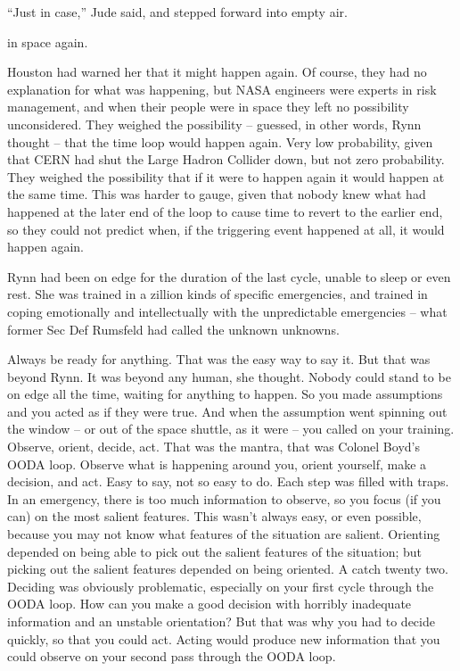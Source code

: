 “Just in case,” Jude said, and stepped forward into empty air.




 in space again.

Houston had warned her that it might happen again. Of course, they had no explanation for what was happening, but NASA engineers were experts in risk management, and when their people were in space they left no possibility unconsidered. They weighed the possibility – guessed, in other words, Rynn thought – that the time loop would happen again. Very low probability, given that CERN had shut the Large Hadron Collider down, but not zero probability. They weighed the possibility that if it were to happen again it would happen at the same time. This was harder to gauge, given that nobody knew what had happened at the later end of the loop to cause time to revert to the earlier end, so they could not predict when, if the triggering event happened at all, it would happen again.

Rynn had been on edge for the duration of the last cycle, unable to sleep or even rest. She was trained in a zillion kinds of specific emergencies, and trained in coping emotionally and intellectually with the unpredictable emergencies – what former Sec Def Rumsfeld had called the unknown unknowns.

Always be ready for anything. That was the easy way to say it. But that was beyond Rynn. It was beyond any human, she thought. Nobody could stand to be on edge all the time, waiting for anything to happen. So you made assumptions and you acted as if they were true. And when the assumption went spinning out the window – or out of the space shuttle, as it were – you called on your training. Observe, orient, decide, act. That was the mantra, that was Colonel Boyd’s OODA loop. Observe what is happening around you, orient yourself, make a decision, and act. Easy to say, not so easy to do. Each step was filled with traps. In an emergency, there is too much information to observe, so you focus (if you can) on the most salient features. This wasn’t always easy, or even possible, because you may not know what features of the situation are salient. Orienting depended on being able to pick out the salient features of the situation; but picking out the salient features depended on being oriented. A catch twenty two. Deciding was obviously problematic, especially on your first cycle through the OODA loop. How can you make a good decision with horribly inadequate information and an unstable orientation? But that was why you had to decide quickly, so that you could act. Acting would produce new information that you could observe on your second pass through the OODA loop.

